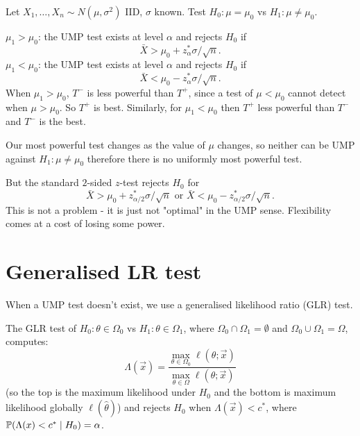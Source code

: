 \documentclass[10pt, a4paper]{article}
\begin{document}
\begin{example}
    Let $X_1, \dotsc, X_n \sim N(\mu, \sigma ^ 2)$ IID,
    $\sigma$ known.
    Test $H_0 : \mu = \mu_0$ vs $H_1 : \mu \neq \mu_0$.

    $\mu_1 > \mu_0$:
    the UMP test exists at level $\alpha$ and rejects $H_0$ if
    \[
    \bar{X} > \mu_0 + z_{\alpha}^{*}\sigma / \sqrt{n}.
    \]
    $\mu_1 < \mu_0$:
    the UMP test exists at level $\alpha$ and rejects $H_0$ if
    \[
    \bar{X} < \mu_0 - z_{\alpha}^{*}\sigma / \sqrt{n}.
    \]
    When $\mu_1 > \mu_0$,
    $T ^ {-}$ is less powerful than $T ^ {+}$\footnotemark,
    since a test of $\mu < \mu_0$ cannot detect when $\mu > \mu_0$.
    So $T ^ {+}$ is best.
    Similarly,
    for $\mu_1 < \mu_0$ then $T ^ {+}$ less powerful than $T ^ {-}$ and $T ^ {-}$ is the best.

    Our most powerful test changes as the value of $\mu$ changes,
    so neither can be UMP against $H_1 : \mu \neq \mu_0$ therefore there is no uniformly most powerful test.

    But the standard $2$-sided $z$-test rejects $H_0$ for
    \[
    \bar{X} > \mu_0 + z_{\alpha / 2}^{*}\sigma / \sqrt{n}\text{ or }\bar{X} < \mu_0 - z_{\alpha / 2}^{*}\sigma / \sqrt{n}.
    \]
    This is not a problem -
    it is just not
    "optimal"
    in the UMP sense.
    Flexibility comes at a cost of losing some power.
\end{example}

\newpage

\section{Generalised LR test}
When a UMP test doesn't exist,
we use a generalised likelihood ratio
(GLR)
test.

\begin{definition}
    The GLR test of $H_0 : \theta \in \Omega_0$ vs $H_1 : \theta \in \Omega_1$,
    where $\Omega_0 \cap \Omega_1 = \emptyset$ and $\Omega_0 \cup \Omega_1 = \Omega$,
    computes:
    \[
    \Lambda(\vec{x}) = \frac{\max_{\theta \in \Omega_0}{\ell(\theta; \vec{x})}}{\max_{\theta \in \Omega}{\ell(\theta; \vec{x})}}
    \]
    (so the top is the maximum likelihood under $H_0$ and the bottom is maximum likelihood globally $\ell(\hat{\theta})$)
    and rejects $H_0$ when $\Lambda(\vec{x}) < c ^ {*}$,
    where $\P(\Lambda(x) < c ^ {*} \mid H_0) = \alpha$.
\end{definition}
\end{document}
